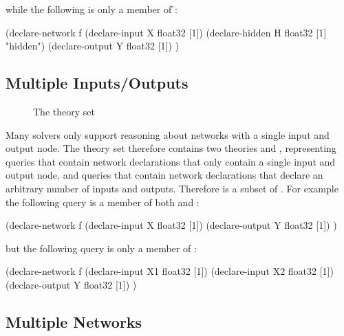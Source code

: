 while the following is only a member of \h{}:

\begin{code}[style=lbnf]
(declare-network f
    (declare-input  X float32 [1])
    (declare-hidden H float32 [1] "hidden")
    (declare-output Y float32 [1])
)
\end{code}

\subsection{Multiple Inputs/Outputs}
\label{sec:multiple-inputs-outputs}

\begin{figure}[h]
\centering
{}
\caption{The \multiIO{} theory set}
\label{fig:multiple-inputs-outputs-set}
\end{figure}

Many solvers only support reasoning about networks with a single input and output node. The \multiIO{} theory set therefore contains two theories \sio{} and \mio{}, representing queries that contain network declarations that only contain a single input and output node, and queries that contain network declarations that declare an arbitrary number of inputs and outputs. Therefore \sio{} is a subset of \mio{}. For example the following query is a member of both \sio{} and \mio{}:

\begin{code}[style=lbnf]
(declare-network f
    (declare-input  X float32 [1])
    (declare-output Y float32 [1])
)
\end{code}

but the following query is only a member of \mio{}:

\begin{code}[style=lbnf]
(declare-network f
    (declare-input  X1 float32 [1])
    (declare-input  X2 float32 [1])
    (declare-output Y  float32 [1])
)
\end{code}

\subsection{Multiple Networks}
\label{sec:multiple-networks}

